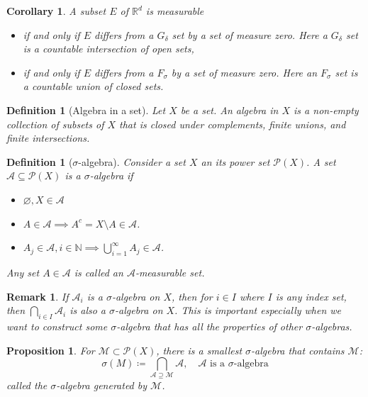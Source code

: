 \documentclass[11pt, letter]{book}
\newtheorem{definition}[theorem]{Definition}
\newtheorem{corollary}[theorem]{Corollary}
\newtheorem{proposition}[theorem]{Proposition}
\newtheorem{remark}{Remark}
\newcommand\R{\mathbb{R}}
\begin{document}
\begin{corollary}
A subset $E$ of $\R^d$ is measurable 
\begin{itemize}
    \item if and only if $E$ differs from a $G_\delta$ set by a set of measure zero. Here a $G_\delta$ set is a countable intersection of open sets,
    \item if and only if $E$ differs from a $F_\sigma$ by a set of measure zero. Here an $F_\sigma$ set is a countable union of closed sets.
\end{itemize}
\end{corollary}
\begin{definition}[Algebra in a set]
Let $X$ be a set. An algebra in $X$ is a non-empty collection of subsets of $X$ that is closed under complements, finite unions, and finite intersections. 
\end{definition}
\begin{definition}[$\sigma$-algebra]
Consider a set $X$ an its power set $\mathcal{P}(X)$. A set $\mathcal{A} \subseteq \mathcal{P}(X)$ is a $\sigma$-algebra if 
\begin{itemize}
    \item $\varnothing, X \in \mathcal{A} $
    \item $A\in \mathcal{A} \implies A^c = X\setminus A \in \mathcal{A}$.
    \item $A_j \in \mathcal{A}, i\in \mathbb{N} \implies \bigcup^\infty_{i=1} A_j \in \mathcal{A}$.
\end{itemize}
Any set $A\in \mathcal{A}$ is called an $\mathcal{A}$-measurable set. 
\end{definition}
\begin{remark}
If $\mathcal{A}_i$ is a $\sigma$-algebra on $X$, then for $i \in I$ where $I$ is any index set, then $\bigcap_{i\in I} \mathcal{A}_i$ is also a $\sigma$-algebra on $X$. This is important especially when we want to construct some $\sigma$-algebra that has all the properties of other $\sigma$-algebras.
\end{remark}
\begin{proposition}
For $\mathcal{M} \subset \mathcal{P}(X)$, there is a smallest $\sigma$-algebra that contains $\mathcal{M}$:
\begin{equation*}
    \sigma(M) \coloneqq  \bigcap_{\mathcal{A}\supseteq \mathcal{M}} \mathcal{A}, \quad \mathcal{A} \text{ is a $\sigma$-algebra}
\end{equation*}
called the $\sigma$-algebra generated by $\mathcal{M}$. 
\end{proposition}
\end{document}
